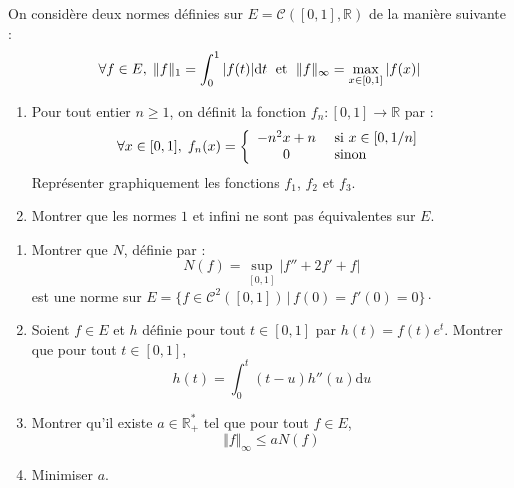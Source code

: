 \documentclass[a4paper,twoside,french,11pt]{VcCours}
\newcommand{\dt}{\text{d}t}
\begin{document}
\begin{Exercice}{} On considère deux normes définies sur $E= \mathcal{C}([0,1], \mathbb{R})$ de la manière suivante :
$$ \forall f \in E, \; \Vert f \Vert_1 = \int_0^1 \vert f(t) \vert \dt \; \hbox{ et } \; \Vert f \Vert_{\infty} = \max_{x \in [0,1]} \vert f(x) \vert$$
\begin{enumerate}
\item Pour tout entier $n \geq 1$, on définit la fonction $f_n : [0,1] \rightarrow \mathbb{R}$ par :
$$ \forall x \in [0,1], \; f_n(x) = \left\lbrace \begin{array}{cl}
-n^2x+n & \hbox{ si } x \in [0,1/n] \\
0 & \hbox{ sinon}
\end{array}\right.$$
Représenter graphiquement les fonctions $f_1$, $f_2$ et $f_3$.
\item Montrer que les normes $1$ et infini ne sont pas équivalentes sur $E$.
\end{enumerate}
\end{Exercice}

\begin{Exercice}[$\bigstar$]{}
\begin{enumerate}
\item Montrer que $N$, définie par :
$$ N(f) = \sup_{[0,1]} \vert f''+2f'+f \vert $$
est une norme sur $E = \lbrace f \in \mathcal{C}^2([0,1]) \, \vert \, f(0)=f'(0)=0 \rbrace \cdot$
\item Soient $f \in E$ et $h$ définie pour tout $t \in [0,1]$ par $h(t)=f(t)e^t$. Montrer que pour tout $t \in [0,1]$,
$$ h(t) = \int_{0}^t (t-u) h''(u) \textrm{d}u$$
\item Montrer qu'il existe $a \in \mathbb{R}_+^{*}$ tel que pour tout $f \in E$,
$$ \Vert f \Vert_{\infty} \leq a N(f)$$
\item Minimiser $a$.
\end{enumerate}
\end{Exercice}
\end{document}

